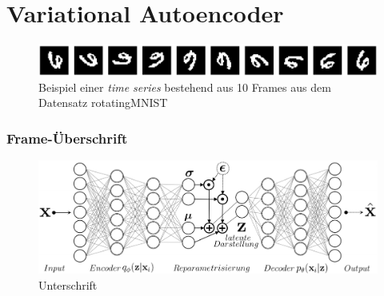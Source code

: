 

\author[Jannis Klingler]{Nix}


\beamertemplatenavigationsymbolsempty{}




\section{Variational Autoencoder}

\begin{frame}
	\begin{figure}[!htbp]
		\includegraphics[scale=0.2]{Bilder/rotatingMNIST}
		\caption{Beispiel einer \emph{time series} bestehend aus 10 Frames aus dem Datensatz rotatingMNIST}
	\end{figure}
\end{frame}

\begin{frame}
	\frametitle{Frame-Überschrift}
	\begin{figure}[htbp!]
		\includegraphics[scale=0.25]{Bilder/VAE-Architektur.png}
		\caption{Unterschrift}
	\end{figure}
\end{frame}
